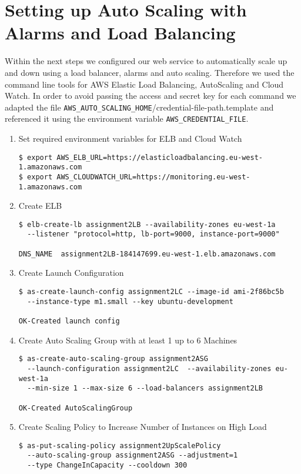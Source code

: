 \documentclass{article}
\begin{document}
\setcounter{section}{1}
\section{Setting up Auto Scaling with Alarms and Load Balancing}
Within the next steps we configured our web service to automatically scale up and down using 
a load balancer, alarms and auto scaling. Therefore we used the command line tools for 
AWS Elastic Load Balancing, AutoScaling and Cloud Watch.
In order to avoid passing the access and secret key for each command we adapted the file 
\verb|AWS_AUTO_SCALING_HOME|/credential-file-path.template and referenced it using the environment variable \verb|AWS_CREDENTIAL_FILE|.
\begin{enumerate}

	\item Set required environment variables for ELB and Cloud Watch
\begin{verbatim}
$ export AWS_ELB_URL=https://elasticloadbalancing.eu-west-1.amazonaws.com
$ export AWS_CLOUDWATCH_URL=https://monitoring.eu-west-1.amazonaws.com
\end{verbatim}

	\item Create ELB
\begin{verbatim}
$ elb-create-lb assignment2LB --availability-zones eu-west-1a 
  --listener "protocol=http, lb-port=9000, instance-port=9000"

DNS_NAME  assignment2LB-184147699.eu-west-1.elb.amazonaws.com
\end{verbatim}

	\item Create Launch Configuration
\begin{verbatim}
$ as-create-launch-config assignment2LC --image-id ami-2f86bc5b 
  --instance-type m1.small --key ubuntu-development

OK-Created launch config
\end{verbatim}

	\item Create Auto Scaling Group with at least 1 up to 6 Machines
\begin{verbatim}
$ as-create-auto-scaling-group assignment2ASG 
  --launch-configuration assignment2LC  --availability-zones eu-west-1a 
  --min-size 1 --max-size 6 --load-balancers assignment2LB

OK-Created AutoScalingGroup
\end{verbatim}

	\item Create Scaling Policy to Increase Number of Instances on High Load
\begin{verbatim}
$ as-put-scaling-policy assignment2UpScalePolicy 
  --auto-scaling-group assignment2ASG --adjustment=1 
  --type ChangeInCapacity --cooldown 300


\end{verbatim}
\end{enumerate}
\end{document}
